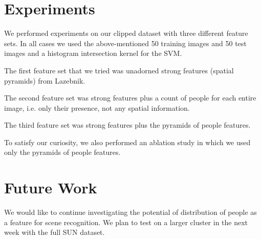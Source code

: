 \documentclass[11pt]{article}
\begin{document}




\section{Experiments}
We performed experiments on our clipped dataset with three different feature sets.  In all cases we used the above-mentioned 50 training images and 50 test images and a histogram intersection kernel for the SVM.

The first feature set that we tried was unadorned strong features (spatial pyramids) from Lazebnik.

The second feature set was strong features plus a count of people for each entire image, i.e. only their presence, not any spatial information.

The third feature set was strong features plus the pyramids of people features.

To satisfy our curiosity, we also performed an ablation study in which we used only the pyramids of people features.

\section{Future Work}
We would like to continue investigating the potential of distribution of people as a feature for scene recognition.  We plan to test on a larger cluster in the next week with the full SUN dataset.



\end{document}
